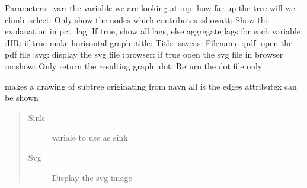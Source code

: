 \documentclass[letterpaper,10pt,english]{sphinxmanual}
\begin{document}
\begin{fulllineitems}
\begin{fulllineitems}
\sphinxAtStartPar
Parameters:
:var:  the variable we are looking at
:up:  how far up the tree will we climb
:select: Only show the nodes which contributes
:showatt: Show the explanation in pct
:lag:  If true, show all lags, else aggregate lags for each variable.
:HR: if true make horisontal graph
:title: Title
:saveas: Filename
:pdf: open the pdf file
:svg: display the svg file
:browser: if true open the svg file in browser
:noshow: Only return the resulting graph
:dot: Return the dot file only

\end{fulllineitems}


\begin{fulllineitems}
\label{\detokenize{core/modelclass:modelclass.Graph_Draw_Mixin.dftodottable}}
\pysigstartsignatures
{}
\pysigstopsignatures
\end{fulllineitems}


\begin{fulllineitems}
\label{\detokenize{core/modelclass:modelclass.Graph_Draw_Mixin.todot}}
\pysigstartsignatures
{}
\pysigstopsignatures
\sphinxAtStartPar
makes a drawing of subtree originating from navn
all is the edges
attributex can be shown
\begin{quote}\begin{description}
\item[{Sink}] \leavevmode
\sphinxAtStartPar
variale to use as sink

\item[{Svg}] \leavevmode
\sphinxAtStartPar
Display the svg image

\end{description}\end{quote}

\end{fulllineitems}


\end{fulllineitems}
\end{document}
